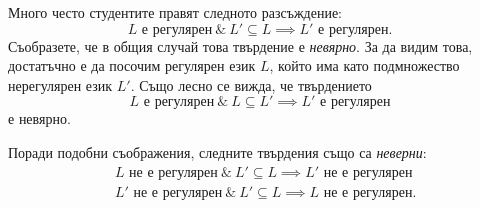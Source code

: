\begin{extra}
  \begin{remark}
    Много често студентите правят следното разсъждение:
    \[L \text{ е регулярен}\ \&\ L' \subseteq L \implies L'\text{ е регулярен}.\]
    Съобразете, че в общия случай това твърдение е {\em невярно}.
    За да видим това, достатъчно е да посочим регулярен език $L$, който има като
    подмножество нерегулярен език $L'$.
    Също лесно се вижда, че твърдението
    \[L \text{ е регулярен}\ \&\ L \subseteq L' \implies L'\text{ е регулярен}\]
    е невярно.
    
    Поради подобни съображения, следните твърдения също са {\em неверни}:
    \begin{align*}
      & L \text{ не е регулярен}\ \&\ L' \subseteq L \implies L'\text{ не е регулярен}\\
    & L' \text{ не е регулярен}\ \&\ L' \subseteq L \implies L\text{ не е регулярен}.
    \end{align*}
  \end{remark}
\end{extra}

